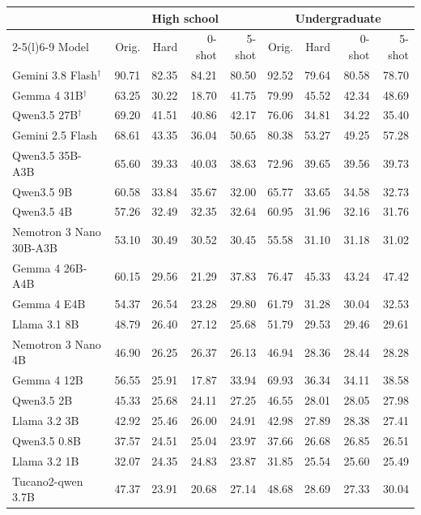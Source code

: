 \begin{table}[t]
\centering
\footnotesize
\setlength{\tabcolsep}{4pt}
\begin{tabular}{@{}lrrrrrrrr@{}}
\toprule
& \multicolumn{4}{c}{High school} & \multicolumn{4}{c}{Undergraduate} \\
\cmidrule(lr){2-5}\cmidrule(l){6-9}
Model & Orig. & Hard & 0-shot & 5-shot & Orig. & Hard & 0-shot & 5-shot \\
\midrule
Gemini 3.8 Flash$^\dagger$ & 90.71 & 82.35 & 84.21 & 80.50 & 92.52 & 79.64 & 80.58 & 78.70 \\
Gemma 4 31B$^\dagger$ & 63.25 & 30.22 & 18.70 & 41.75 & 79.99 & 45.52 & 42.34 & 48.69 \\
Qwen3.5 27B$^\dagger$ & 69.20 & 41.51 & 40.86 & 42.17 & 76.06 & 34.81 & 34.22 & 35.40 \\
\midrule
Gemini 2.5 Flash & 68.61 & 43.35 & 36.04 & 50.65 & 80.38 & 53.27 & 49.25 & 57.28 \\
Qwen3.5 35B-A3B & 65.60 & 39.33 & 40.03 & 38.63 & 72.96 & 39.65 & 39.56 & 39.73 \\
Qwen3.5 9B & 60.58 & 33.84 & 35.67 & 32.00 & 65.77 & 33.65 & 34.58 & 32.73 \\
Qwen3.5 4B & 57.26 & 32.49 & 32.35 & 32.64 & 60.95 & 31.96 & 32.16 & 31.76 \\
Nemotron 3 Nano 30B-A3B & 53.10 & 30.49 & 30.52 & 30.45 & 55.58 & 31.10 & 31.18 & 31.02 \\
Gemma 4 26B-A4B & 60.15 & 29.56 & 21.29 & 37.83 & 76.47 & 45.33 & 43.24 & 47.42 \\
Gemma 4 E4B & 54.37 & 26.54 & 23.28 & 29.80 & 61.79 & 31.28 & 30.04 & 32.53 \\
Llama 3.1 8B & 48.79 & 26.40 & 27.12 & 25.68 & 51.79 & 29.53 & 29.46 & 29.61 \\
Nemotron 3 Nano 4B & 46.90 & 26.25 & 26.37 & 26.13 & 46.94 & 28.36 & 28.44 & 28.28 \\
Gemma 4 12B & 56.55 & 25.91 & 17.87 & 33.94 & 69.93 & 36.34 & 34.11 & 38.58 \\
Qwen3.5 2B & 45.33 & 25.68 & 24.11 & 27.25 & 46.55 & 28.01 & 28.05 & 27.98 \\
Llama 3.2 3B & 42.92 & 25.46 & 26.00 & 24.91 & 42.98 & 27.89 & 28.38 & 27.41 \\
Qwen3.5 0.8B & 37.57 & 24.51 & 25.04 & 23.97 & 37.66 & 26.68 & 26.85 & 26.51 \\
Llama 3.2 1B & 32.07 & 24.35 & 24.83 & 23.87 & 31.85 & 25.54 & 25.60 & 25.49 \\
Tucano2-qwen 3.7B & 47.37 & 23.91 & 20.68 & 27.14 & 48.68 & 28.69 & 27.33 & 30.04 \\

\end{tabular}
\end{table}
